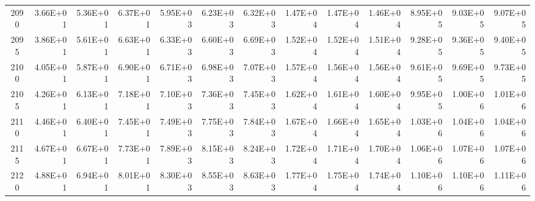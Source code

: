 \documentclass{article}
\begin{document}
\begin{table}
\begin{tabular}{crrr|rrr|rrr|rrr}
2090     & 3.66E+01 & 5.36E+01 & 6.37E+01 & 5.95E+03 & 6.23E+03 & 6.32E+03 & 1.47E+04 & 1.47E+04 & 1.46E+04 & 8.95E+05 & 9.03E+05 & 9.07E+05 \\
2095     & 3.86E+01 & 5.61E+01 & 6.63E+01 & 6.33E+03 & 6.60E+03 & 6.69E+03 & 1.52E+04 & 1.52E+04 & 1.51E+04 & 9.28E+05 & 9.36E+05 & 9.40E+05 \\
2100     & 4.05E+01 & 5.87E+01 & 6.90E+01 & 6.71E+03 & 6.98E+03 & 7.07E+03 & 1.57E+04 & 1.56E+04 & 1.56E+04 & 9.61E+05 & 9.69E+05 & 9.73E+05 \\
2105     & 4.26E+01 & 6.13E+01 & 7.18E+01 & 7.10E+03 & 7.36E+03 & 7.45E+03 & 1.62E+04 & 1.61E+04 & 1.60E+04 & 9.95E+05 & 1.00E+06 & 1.01E+06 \\
2110     & 4.46E+01 & 6.40E+01 & 7.45E+01 & 7.49E+03 & 7.75E+03 & 7.84E+03 & 1.67E+04 & 1.66E+04 & 1.65E+04 & 1.03E+06 & 1.04E+06 & 1.04E+06 \\
2115     & 4.67E+01 & 6.67E+01 & 7.73E+01 & 7.89E+03 & 8.15E+03 & 8.24E+03 & 1.72E+04 & 1.71E+04 & 1.70E+04 & 1.06E+06 & 1.07E+06 & 1.07E+06 \\
2120     & 4.88E+01 & 6.94E+01 & 8.01E+01 & 8.30E+03 & 8.55E+03 & 8.63E+03 & 1.77E+04 & 1.75E+04 & 1.74E+04 & 1.10E+06 & 1.10E+06 & 1.11E+06
\end{tabular}   \end{table}
\end{document}
